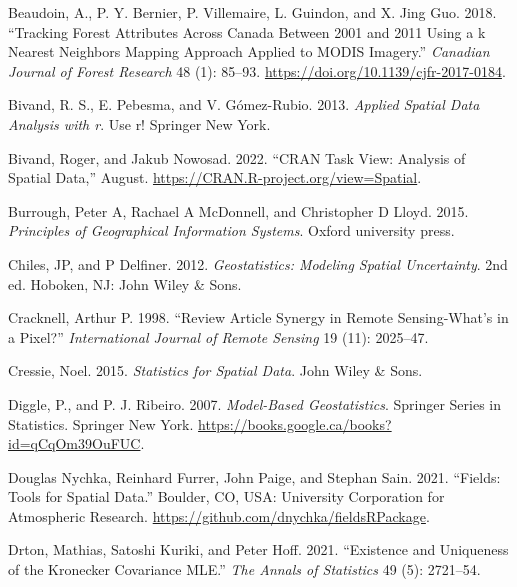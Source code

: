 \hypertarget{refs}{}
\begin{CSLReferences}{1}{0}
\leavevmode{}%
Beaudoin, A., P. Y. Bernier, P. Villemaire, L. Guindon, and X. Jing Guo. 2018. {``Tracking Forest Attributes Across Canada Between 2001 and 2011 Using a k Nearest Neighbors Mapping Approach Applied to MODIS Imagery.''} \emph{Canadian Journal of Forest Research} 48 (1): 85--93. \url{https://doi.org/10.1139/cjfr-2017-0184}.

\leavevmode{}%
Bivand, R. S., E. Pebesma, and V. Gómez-Rubio. 2013. \emph{Applied Spatial Data Analysis with r}. Use r! Springer New York.

\leavevmode{}%
Bivand, Roger, and Jakub Nowosad. 2022. {``CRAN Task View: Analysis of Spatial Data,''} August. \url{https://CRAN.R-project.org/view=Spatial}.

\leavevmode{}%
Burrough, Peter A, Rachael A McDonnell, and Christopher D Lloyd. 2015. \emph{Principles of Geographical Information Systems}. Oxford university press.

\leavevmode{}%
Chiles, JP, and P Delfiner. 2012. \emph{Geostatistics: Modeling Spatial Uncertainty}. 2nd ed. Hoboken, NJ: John Wiley \& Sons.

\leavevmode{}%
Cracknell, Arthur P. 1998. {``Review Article Synergy in Remote Sensing-What's in a Pixel?''} \emph{International Journal of Remote Sensing} 19 (11): 2025--47.

\leavevmode{}%
Cressie, Noel. 2015. \emph{Statistics for Spatial Data}. John Wiley \& Sons.

\leavevmode{}%
Diggle, P., and P. J. Ribeiro. 2007. \emph{Model-Based Geostatistics}. Springer Series in Statistics. Springer New York. \url{https://books.google.ca/books?id=qCqOm39OuFUC}.

\leavevmode{}%
Douglas Nychka, Reinhard Furrer, John Paige, and Stephan Sain. 2021. {``Fields: Tools for Spatial Data.''} Boulder, CO, USA: University Corporation for Atmospheric Research. \url{https://github.com/dnychka/fieldsRPackage}.

\leavevmode{}%
Drton, Mathias, Satoshi Kuriki, and Peter Hoff. 2021. {``Existence and Uniqueness of the Kronecker Covariance MLE.''} \emph{The Annals of Statistics} 49 (5): 2721--54.


\end{CSLReferences}
